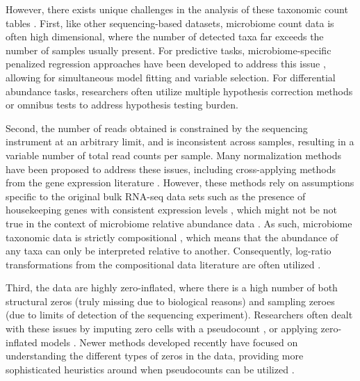 \documentclass[10pt,letterpaper]{article}
\begin{document}
However, there exists unique challenges in the analysis of these taxonomic count tables \cite{li2019,li2015}. First, like other sequencing-based datasets, microbiome count data is often high dimensional, where the number of detected taxa far exceeds the number of samples usually present. For predictive tasks, microbiome-specific penalized regression approaches have been developed to address this issue \cite{shi2016}, allowing for simultaneous model fitting and variable selection. For differential abundance tasks, researchers often utilize multiple hypothesis correction methods \cite{sankaran2014,benjamini1995} or omnibus tests \cite{chen2018} to address hypothesis testing burden. 

Second, the number of reads obtained is constrained by the sequencing instrument at an arbitrary limit, and is inconsistent across samples, resulting in a variable number of total read counts per sample. Many normalization methods \cite{weiss2017} have been proposed to address these issues, including cross-applying methods from the gene expression literature \cite{mcmurdie2014}. However, these methods rely on assumptions specific to the original bulk RNA-seq data sets such as the presence of housekeeping genes with consistent expression levels \cite{love2014}, which might not be not true in the context of microbiome relative abundance data \cite{quinn2019,quinn2018b}. As such, microbiome taxonomic data is strictly compositional \cite{gloor2017}, which means that the abundance of any taxa can only be interpreted relative to another. Consequently, log-ratio transformations from the compositional data literature are often utilized \cite{aitchison1999}. 

Third, the data are highly zero-inflated, where there is a high number of both structural zeros (truly missing due to biological reasons) and sampling zeroes (due to limits of detection of the sequencing experiment). Researchers often dealt with these issues by imputing zero cells with a pseudocount \cite{kurtz2015}, or applying zero-inflated models \cite{chen2018, kaul2017}. Newer methods developed recently have focused on understanding the different types of zeros in the data, providing more sophisticated heuristics around when pseudocounts can be utilized \cite{kaul2017a}.   
\end{document}
